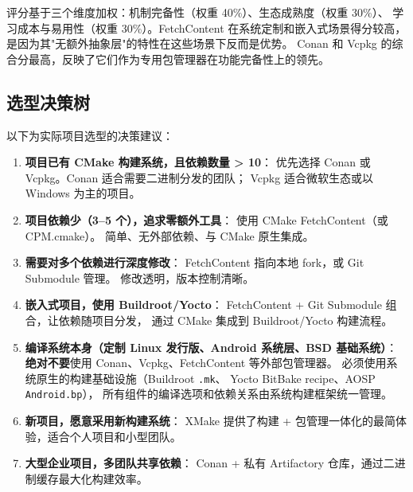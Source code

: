 \documentclass[12pt,a4paper,fontset=fandol]{ctexbook}
\begin{document}
\begin{note}[ title={评分说明}, unbreakable]
评分基于三个维度加权：机制完备性（权重 40\%）、生态成熟度（权重 30\%）、
学习成本与易用性（权重 30\%）。FetchContent 在系统定制和嵌入式场景得分较高，
是因为其"无额外抽象层"的特性在这些场景下反而是优势。
Conan 和 Vcpkg 的综合分最高，反映了它们作为专用包管理器在功能完备性上的领先。
\end{note}

\subsection{选型决策树}

以下为实际项目选型的决策建议：

\begin{enumerate}[nosep]
  \item \textbf{项目已有 CMake 构建系统，且依赖数量 > 10}：
        优先选择 Conan 或 Vcpkg。Conan 适合需要二进制分发的团队；
        Vcpkg 适合微软生态或以 Windows 为主的项目。

  \item \textbf{项目依赖少（3--5 个），追求零额外工具}：
        使用 CMake FetchContent（或 CPM.cmake）。
        简单、无外部依赖、与 CMake 原生集成。

  \item \textbf{需要对多个依赖进行深度修改}：
        FetchContent 指向本地 fork，或 Git Submodule 管理。
        修改透明，版本控制清晰。

  \item \textbf{嵌入式项目，使用 Buildroot/Yocto}：
        FetchContent + Git Submodule 组合，让依赖随项目分发，
        通过 CMake 集成到 Buildroot/Yocto 构建流程。

  \item \textbf{编译系统本身（定制 Linux 发行版、Android 系统层、BSD 基础系统）}：
        \textbf{绝对不要}使用 Conan、Vcpkg、FetchContent 等外部包管理器。
        必须使用系统原生的构建基础设施（Buildroot \texttt{.mk}、
        Yocto BitBake recipe、AOSP \texttt{Android.bp}），
        所有组件的编译选项和依赖关系由系统构建框架统一管理。

  \item \textbf{新项目，愿意采用新构建系统}：
        XMake 提供了构建 + 包管理一体化的最简体验，适合个人项目和小型团队。

  \item \textbf{大型企业项目，多团队共享依赖}：
        Conan + 私有 Artifactory 仓库，通过二进制缓存最大化构建效率。
\end{enumerate}
\end{document}
